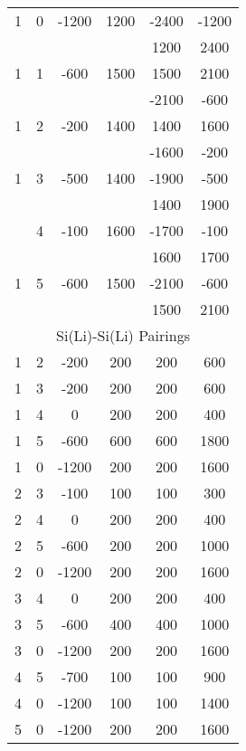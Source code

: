 \begin{ThreePartTable}
\begin{longtable}{c|c|c|c|c|c}
        1 & 0 & -1200 & 1200 & -2400 & -1200 \\
         &  &  &  & 1200 & 2400\\
        1 & 1 & -600 & 1500 & 1500 & 2100 \\
         &  &  &  & -2100 & -600\\
        1 & 2 & -200 & 1400 & 1400 & 1600 \\
         &  &  &  & -1600 & -200\\
        1 & 3 & -500 & 1400 & -1900 & -500 \\
         &  &  &  & 1400 & 1900\\
         \bottomrule
         \pagebreak
        1 & 4 & -100 & 1600 & -1700 & -100 \\
         &  &  &  & 1600 & 1700\\
        1 & 5 & -600 & 1500 & -2100 & -600 \\
         &  &  &  & 1500 & 2100\\
        \hline
        \multicolumn{6}{c}{Si(Li)-Si(Li) Pairings}\\
        \hline
        1 & 2 & -200 & 200 & 200 & 600 \\
        1 & 3 & -200 & 200 & 200 & 600 \\
        1 & 4 & 0 & 200 & 200 & 400 \\
        1 & 5 & -600 & 600 & 600 & 1800 \\
        1 & 0 & -1200 & 200 & 200 & 1600 \\
        2 & 3 & -100 & 100 & 100 & 300 \\
        2 & 4 & 0 & 200 & 200 & 400 \\
        2 & 5 & -600 & 200 & 200 & 1000 \\
        2 & 0 & -1200 & 200 & 200 & 1600 \\
        3 & 4 & 0 & 200 & 200 & 400 \\
        3 & 5 & -600 & 400 & 400 & 1000 \\
        3 & 0 & -1200 & 200 & 200 & 1600 \\
        4 & 5 & -700 & 100 & 100 & 900\\
        4 & 0 & -1200 & 100 & 100 & 1400 \\
        5 & 0 & -1200 & 200 & 200 & 1600\\
        \bottomrule
\end{longtable}
\end{ThreePartTable}